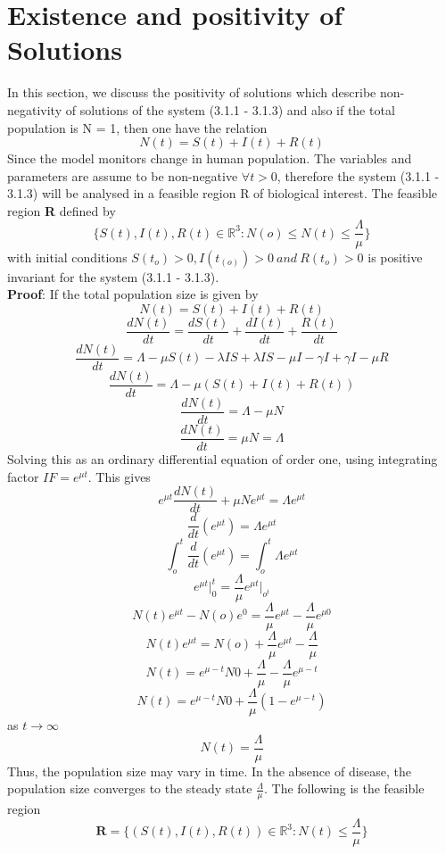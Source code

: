 \documentclass[a4paper,12pt]{report}
\numberwithin{equation}{section}
\begin{document}
\section{Existence and positivity of Solutions}

In this section, we discuss the positivity of solutions which describe non-negativity of solutions of the system (3.1.1 - 3.1.3) and also if the total population is N = 1, then one have the relation 
\begin{equation*}
N(t) = S(t) + I(t) + R(t) 
\end{equation*}
Since the model monitors change in human population. The variables and parameters are assume to be non-negative $\forall t > 0 $, therefore the system (3.1.1 - 3.1.3) will be analysed in a feasible region R of biological interest.
\theorem The feasible region \textbf{R} defined by \begin{equation*}\{S(t),I(t),R(t) \in \mathbb{R}^{3}: N(o)\leq N(t) \leq \frac{\Lambda}{\mu} \}
\end{equation*}
with initial conditions $S(t_{o})> 0, I(t_(o))> 0 \ and \ R(t_{o})> 0 $ is positive invariant for the system (3.1.1 - 3.1.3).\\
\textbf{Proof}: If the total population size is given by 
\begin{equation*}
N(t) = S(t) + I(t) + R(t) 
\end{equation*}
\begin{equation*}
\frac{dN(t)}{dt} = \frac{dS(t)}{dt} + \frac{dI(t)}{dt} + \frac{R(t)}{dt}
\end{equation*}
\begin{equation*}
\frac{dN(t)}{dt} = \Lambda - \mu S(t) - \lambda IS +  \lambda IS -\mu I - \gamma I + \gamma I - \mu R 
\end{equation*}
\begin{equation*}
\frac{dN(t)}{dt} = \Lambda - \mu(S(t)+I(t)+R(t))
\end{equation*} 
\begin{equation*}
\frac{dN(t)}{dt} = \Lambda - \mu N
\end{equation*}
$$\frac{dN(t)}{dt} = \mu N = \Lambda $$
Solving this as an ordinary differential equation of order one, using integrating factor $IF = e^{\mu t}$. This gives 
$$e^{\mu t}\frac{dN(t)}{dt} + \mu N e^{\mu t} = \Lambda e^{\mu t}$$
$$\frac{d}{dt}\left( e^{\mu t} \right) = \Lambda e^{\mu t}$$
$$\int_{o}^{t} \frac{d}{dt}\left( e^{\mu t} \right) = \int_{o}^{t} \Lambda e^{\mu t}$$
$$e^{\mu t}\vert_{0}^{t} = \frac{\Lambda}{\mu} e^{\mu t}\vert_{o^{t}} $$
$$N(t)e^{\mu t} - N(o)e^{0} =  \frac{\Lambda}{\mu} e^{\mu t} -  \frac{\Lambda}{\mu} e^{\mu 0}$$
$$N(t)e^{\mu t} = N(o) + \frac{\Lambda}{\mu} e^{\mu t} -  \frac{\Lambda}{\mu} $$
$$N(t) = e^{\mu -t}N{0} + \frac{\Lambda}{\mu} - \frac{\Lambda}{\mu}e^{\mu -t}$$
$$N(t) = e^{\mu -t}N{0} + \frac{\Lambda}{\mu} \left(1 - e^{\mu -t} \right)$$
as $t \to \infty$ 
$$N(t) = \frac{\Lambda}{\mu} $$
Thus, the population size may vary in time. In the absence of disease, the population size converges to the steady state $\frac{\Lambda}{\mu}$. The following is the feasible region 
$$\textbf{R} = \{(S(t),I(t),R(t))\in \mathbb{R}^{3}: N(t)\leq  \frac{\Lambda}{\mu}\}$$
\end{document}
